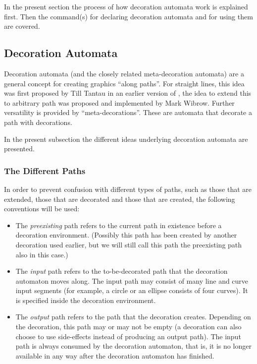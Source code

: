 In the present section the process of how decoration automata work is explained
first. Then the command(s) for declaring decoration automata and for using them
are covered.


\subsection{Decoration Automata}

Decoration automata (and the closely related meta-decoration automata) are a
general concept for creating graphics ``along paths''. For straight lines, this
idea was first proposed by Till Tantau in an earlier version of \pgfname, the
idea to extend this to arbitrary path was proposed and implemented by Mark
Wibrow. Further versatility is provided by ``meta-decorations''. These are
automata that decorate a path with decorations.

In the present subsection the different ideas underlying decoration automata
are presented.


\subsubsection{The Different Paths}

In order to prevent confusion with different types of paths, such as those that
are extended, those that are decorated and those that are created, the
following conventions will be used:
%
\begin{itemize}
    \item The \emph{preexisting} path refers to the current path in existence
        before a decoration environment. (Possibly this path has been created
        by another decoration used earlier, but we will still call this path
        the preexisting path also in this case.)
    \item The \emph{input} path refers to the to-be-decorated path that the
        decoration automaton moves along. The input path may consist of many
        line and curve input segments (for example, a circle or an ellipse
        consists of four curves). It is specified inside the decoration
        environment.
    \item The \emph{output} path refers to the path that the decoration
        creates. Depending on the decoration, this path may or may not be empty
        (a decoration can also choose to use side-effects instead of producing
        an output path). The input path is always consumed by the decoration
        automaton, that is, it is no longer available in any way after the
        decoration automaton has finished.
\end{itemize}

